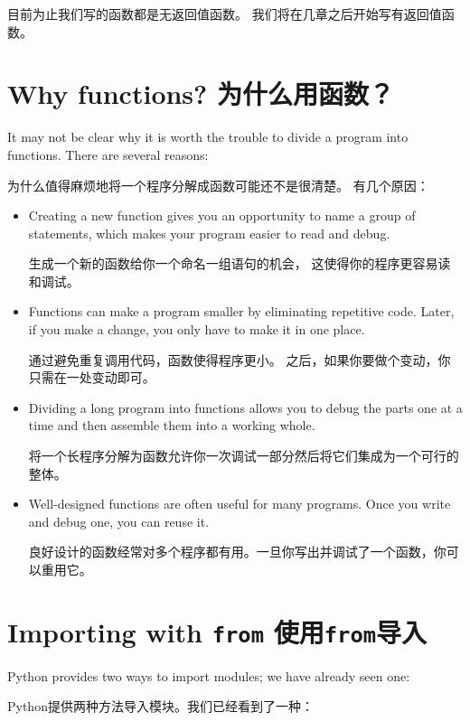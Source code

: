 \documentclass[10pt]{book}
\begin{document}
\begin{CJK}{UTF8}{gbsn}
目前为止我们写的函数都是无返回值函数。
我们将在几章之后开始写有返回值函数。


\section{Why functions? 为什么用函数？}

It may not be clear why it is worth the trouble to divide
a program into functions.  There are several reasons:

为什么值得麻烦地将一个程序分解成函数可能还不是很清楚。
有几个原因：

\begin{itemize}

\item Creating a new function gives you an opportunity to name a group
of statements, which makes your program easier to read and debug.

生成一个新的函数给你一个命名一组语句的机会，
这使得你的程序更容易读和调试。

\item Functions can make a program smaller by eliminating repetitive
code.  Later, if you make a change, you only have
to make it in one place.

通过避免重复调用代码，函数使得程序更小。
之后，如果你要做个变动，你只需在一处变动即可。

\item Dividing a long program into functions allows you to debug the
parts one at a time and then assemble them into a working whole.

将一个长程序分解为函数允许你一次调试一部分然后将它们集成为一个可行的整体。

\item Well-designed functions are often useful for many programs.
Once you write and debug one, you can reuse it.

良好设计的函数经常对多个程序都有用。一旦你写出并调试了一个函数，你可以重用它。

\end{itemize}


\section{Importing with {\tt from} 使用{\tt from}导入}

Python provides two ways to import modules; we have already seen one:

Python提供两种方法导入模块。我们已经看到了一种：


\end{CJK}
\end{document}
